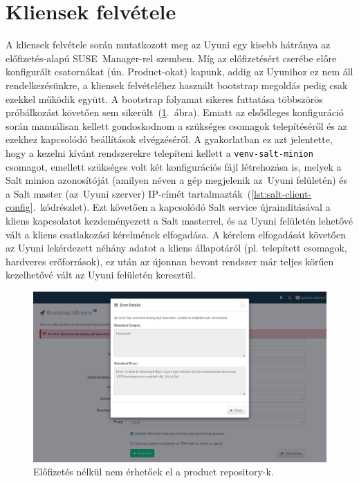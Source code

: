 \section{Kliensek felvétele}
A kliensek felvétele során mutatkozott meg az Uyuni egy kisebb hátránya az előfizetés-alapú SUSE~Manager-rel szemben. Míg az előfizetésért cserébe előre konfigurált csatornákat (ún. Product-okat) kapunk, addig az Uyunihoz ez nem áll rendelkezésünkre, a kliensek felvételéhez használt bootstrap megoldás pedig csak ezekkel működik együtt. A bootstrap folyamat sikeres futtatása többszörös próbálkozást követően sem sikerült~(\ref{fig:uyuni-bootstrap-error}.~ábra). Emiatt az elsődleges konfiguráció során manuálisan kellett gondoskodnom a szükséges csomagok telepítéséről és az ezekhez kapcsolódó beállítások elvégzéséről. A gyakorlatban ez azt jelentette, hogy a kezelni kívánt rendszerekre telepíteni kellett a \texttt{venv-salt-minion} csomagot, emellett szükséges volt két konfigurációs fájl létrehozása is, melyek a Salt minion azonosítóját (amilyen néven a gép megjelenik az~Uyuni felületén) és a Salt master (az~Uyuni szerver) IP-címét tartalmazták~(\ref{lst:salt-client-config}.~kódrészlet).
Ezt követően a kapcsolódó Salt service újraindításával a kliens kapcsolatot kezdeményezett a Salt masterrel, és az Uyuni felületén lehetővé vált a kliens csatlakozási kérelmének elfogadása. A kérelem elfogadását követően az Uyuni lekérdezett néhány adatot a kliens állapotáról (pl. telepített csomagok, hardveres erőforrások), ez után az újonnan bevont rendszer már teljes körűen kezelhetővé vált az Uyuni felületén keresztül.

\begin{figure}[ht]
	\centering
	\includegraphics[width=15cm]{figures/uyuni-bootstrap-error.png}
	\caption{Előfizetés nélkül nem érhetőek el a product repository-k.}
	\label{fig:uyuni-bootstrap-error}
\end{figure}

